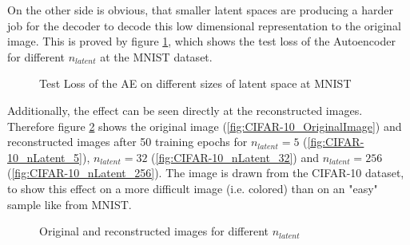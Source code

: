 \documentclass[12pt,DIV14,BCOR12mm,a4paper,footexclude,headinclude,halfparskip-,twoside,openright,cleardoubleempty,idxtotoc,bibtotoc,listtotoc]{scrreprt} %
\numberwithin{equation}{chapter}
\begin{document}
On the other side is obvious, that smaller latent spaces are producing a harder job for the decoder to decode this low dimensional representation to the original image. This is proved by figure \ref{fig:TestLoss_AE_latentSpace}, which shows the test loss of the Autoencoder for different $n_{latent}$ at the MNIST dataset.
	\begin{figure}[htb!]
		\centering
		\resizebox{0.45\linewidth}{!}{}
		\caption{Test Loss of the AE on different sizes of latent space at MNIST}
		\label{fig:TestLoss_AE_latentSpace}
	\end{figure}
Additionally, the effect can be seen directly at the reconstructed images. Therefore figure \ref{fig:Reconstructions_nLatent} shows the original image (\ref{fig:CIFAR-10_OriginalImage}) and reconstructed images after 50 training epochs for $n_{latent}=5$ (\ref{fig:CIFAR-10_nLatent_5}), $n_{latent}=32$ (\ref{fig:CIFAR-10_nLatent_32}) and $n_{latent}=256$ (\ref{fig:CIFAR-10_nLatent_256}). The image is drawn from the CIFAR-10 dataset, to show this effect on a more difficult image (i.e. colored) than on an "easy" sample like from MNIST.
\begin{figure}[htb!]
	\centering
	\qquad
	\qquad
	\qquad
	\qquad
	\caption{Original and reconstructed images for different $n_{latent}$}
	\label{fig:Reconstructions_nLatent}
\end{figure}
\end{document}
